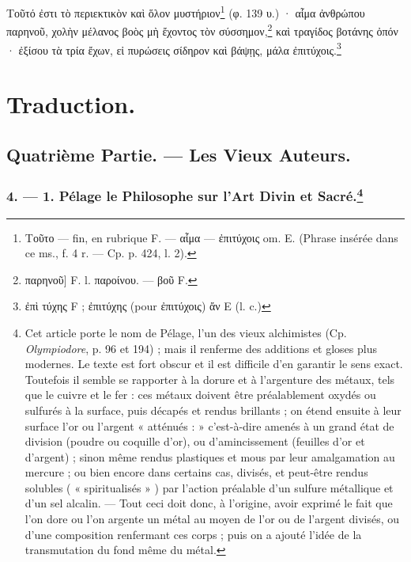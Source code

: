 \documentclass[a4paper, 11pt, oneside, polutonikogreek, french]{article}
\begin{document}
Τοῦτό ἐστι τὸ περιεκτικὸν καὶ ὅλον μυστήριον\footnote{Τοῦτο --- fin, en rubrique F. --- αἷμα --- ἐπιτύχοις om. E. (Phrase insérée dans ce ms., f. 4 r. --- Cp. p. 424, l. 2).} (φ. 139 υ.) · αἷμα ἀνθρώπου παρηνοῦ, χολὴν μέλανος βοὸς μὴ ἔχοντος τὸν σύσσημον,\footnote{παρηνοῦ] F. l. παροίνου. --- βοῦ F.} καὶ τραγίδος βοτάνης ὀπόν · ἐξίσου τὰ τρία ἔχων, εἰ πυρώσεις σίδηρον καὶ βάψῃς, μάλα ἐπιτύχοις.\footnote{ἐπὶ τύχης F ; ἐπιτύχης (pour ἐπιτύχοις) ἄν E (l. c.)}
\clearpage
\setcounter{footnote}{0}
\section{Traduction.}
\subsection{Quatrième Partie. --- Les Vieux Auteurs.}
\subsubsection[4. --- 1. Pélage le Philosophe sur l'Art Divin et Sacré.]{4. --- 1. Pélage le Philosophe sur l'Art Divin et Sacré.\footnote{Cet article porte le nom de Pélage, l'un des vieux alchimistes (Cp. \emph{Olympiodore}, p. 96 et 194) ; mais il renferme des additions et gloses plus modernes. Le texte est fort obscur et il est difficile d'en garantir le sens exact. Toutefois il semble se rapporter à la dorure et à l'argenture des métaux, tels que le cuivre et le fer : ces métaux doivent être préalablement oxydés ou sulfurés à la surface, puis décapés et rendus brillants ; on étend ensuite à leur surface l'or ou l'argent « atténués : » c'est-à-dire amenés à un grand état de division (poudre ou coquille d'or), ou d'amincissement (feuilles d'or et d'argent) ; sinon même rendus plastiques et mous par leur amalgamation au mercure ; ou bien encore dans certains cas, divisés, et peut-être rendus solubles ( « spiritualisés » ) par l'action préalable d'un sulfure métallique et d'un sel alcalin. --- Tout ceci doit donc, à l'origine, avoir exprimé le fait que l'on dore ou l'on argente un métal au moyen de l'or ou de l'argent divisés, ou d'une composition renfermant ces corps ; puis on a ajouté l'idée de la transmutation du fond même du métal.}}
\end{document}
